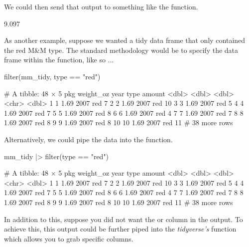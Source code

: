 \noindent We could then send that output to something like the  function.

\begin{outR}
[1] 9.097
\end{outR}

As another example, suppose we wanted a tidy data frame that only contained the red M\&M type. The standard methodology would be to specify the data frame within the  function, like so ...

\begin{inR}
filter(mm_tidy, type == "red")
\end{inR}
\begin{outR}
# A tibble: 48 × 5
     pkg weight_oz  year type  amount
   <dbl>     <dbl> <dbl> <chr>  <dbl>
 1     1      1.69  2007 red        7
 2     2      1.69  2007 red       10
 3     3      1.69  2007 red        5
 4     4      1.69  2007 red        7
 5     5      1.69  2007 red        8
 6     6      1.69  2007 red        4
 7     7      1.69  2007 red        7
 8     8      1.69  2007 red        8
 9     9      1.69  2007 red        8
10    10      1.69  2007 red       11
# 38 more rows
\end{outR}

\noindent
Alternatively, we could pipe the data into the  function.

\begin{inR}
mm_tidy |> filter(type == "red")
\end{inR}
\begin{outR}
# A tibble: 48 × 5
     pkg weight_oz  year type  amount
   <dbl>     <dbl> <dbl> <chr>  <dbl>
 1     1      1.69  2007 red        7
 2     2      1.69  2007 red       10
 3     3      1.69  2007 red        5
 4     4      1.69  2007 red        7
 5     5      1.69  2007 red        8
 6     6      1.69  2007 red        4
 7     7      1.69  2007 red        7
 8     8      1.69  2007 red        8
 9     9      1.69  2007 red        8
10    10      1.69  2007 red       11
# 38 more rows
\end{outR}

In addition to this, suppose you did not want the  or  column in the output. To achieve this, this output could be further piped into the \textit{tidyverse's}  function which allows you to grab specific columns.


